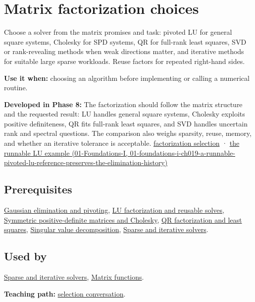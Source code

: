 \hypertarget{appendix-221a483bec2d}{}
\section{Matrix factorization choices}\label{appendix-221a483bec2d-matrix-factorization-choices}

Choose a solver from the matrix promises and task: pivoted LU for general square systems, Cholesky for SPD systems, QR for full-rank least squares, SVD or rank-revealing methods when weak directions matter, and iterative methods for suitable large sparse workloads. Reuse factors for repeated right-hand sides.

\textbf{Use it when:} choosing an algorithm before implementing or calling a numerical routine.

\textbf{Developed in Phase 8:} The factorization should follow the matrix structure and the requested result: LU handles general square systems, Cholesky exploits positive definiteness, QR fits full-rank least squares, and SVD handles uncertain rank and spectral questions. The comparison also weighs sparsity, reuse, memory, and whether an iterative tolerance is acceptable. \hyperref[02-foundations-ii-ch038-choose-a-factorization-from-structure-and-the-requested-answer]{factorization selection} · \href{../01-Foundations-I/main.pdf\#nameddest=01-foundations-i-ch019-a-runnable-pivoted-lu-reference-preserves-the-elimination-history}{the runnable LU example (01-Foundations-I, 01-foundations-i-ch019-a-runnable-pivoted-lu-reference-preserves-the-elimination-history)}

\subsection{Prerequisites}\label{appendix-221a483bec2d-prerequisites}

\hyperref[appendix-f6e77f4a200f]{Gaussian elimination and pivoting}, \hyperref[appendix-55e4b5b0a1e6]{LU factorization and reusable solves}, \hyperref[appendix-50d2ea3c9b26]{Symmetric positive-definite matrices and Cholesky}, \hyperref[appendix-c3421e6b4f2c]{QR factorization and least squares}, \hyperref[appendix-1fad5e7f36fa]{Singular value decomposition}, \hyperref[appendix-67c87a3d9e94]{Sparse and iterative solvers}.

\subsection{Used by}\label{appendix-221a483bec2d-used-by}

\hyperref[appendix-67c87a3d9e94]{Sparse and iterative solvers}, \hyperref[appendix-0f4bc2bf2b1f]{Matrix functions}.

\textbf{Teaching path:} \hyperref[02-foundations-ii-ch038-close-the-journey-with-an-algorithm-selection-conversation]{selection conversation}.
